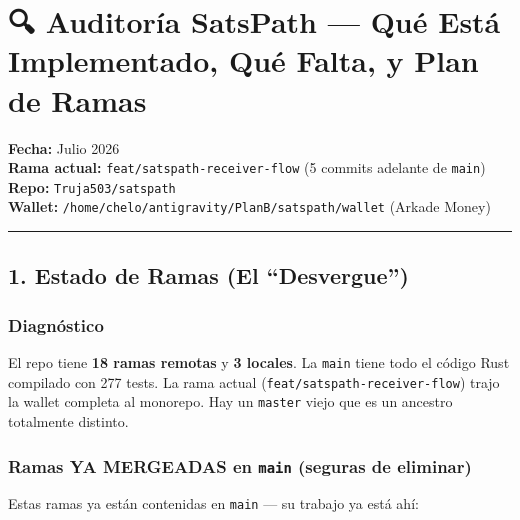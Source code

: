 \documentclass[
]{article}
\author{}
\date{}
\begin{document}
\hypertarget{auditoruxeda-satspath-quuxe9-estuxe1-implementado-quuxe9-falta-y-plan-de-ramas}{%
\section{🔍 Auditoría SatsPath --- Qué Está Implementado, Qué Falta, y
Plan de
Ramas}\label{auditoruxeda-satspath-quuxe9-estuxe1-implementado-quuxe9-falta-y-plan-de-ramas}}

\textbf{Fecha:} Julio 2026\\
\textbf{Rama actual:} \texttt{feat/satspath-receiver-flow} (5 commits
adelante de \texttt{main})\\
\textbf{Repo:} \texttt{Truja503/satspath}\\
\textbf{Wallet:} \texttt{/home/chelo/antigravity/PlanB/satspath/wallet}
(Arkade Money)

\begin{center}\rule{0.5\linewidth}{0.5pt}\end{center}

\hypertarget{estado-de-ramas-el-desvergue}{%
\subsection{1. Estado de Ramas (El
``Desvergue'')}\label{estado-de-ramas-el-desvergue}}

\hypertarget{diagnuxf3stico}{%
\subsubsection{Diagnóstico}\label{diagnuxf3stico}}

El repo tiene \textbf{18 ramas remotas} y \textbf{3 locales}. La
\texttt{main} tiene todo el código Rust compilado con 277 tests. La rama
actual (\texttt{feat/satspath-receiver-flow}) trajo la wallet completa
al monorepo. Hay un \texttt{master} viejo que es un ancestro totalmente
distinto.

\hypertarget{ramas-ya-mergeadas-en-main-seguras-de-eliminar}{%
\subsubsection{\texorpdfstring{Ramas YA MERGEADAS en \texttt{main}
(seguras de
eliminar)}{Ramas YA MERGEADAS en main (seguras de eliminar)}}\label{ramas-ya-mergeadas-en-main-seguras-de-eliminar}}

Estas ramas ya están contenidas en \texttt{main} --- su trabajo ya está
ahí:
\end{document}
